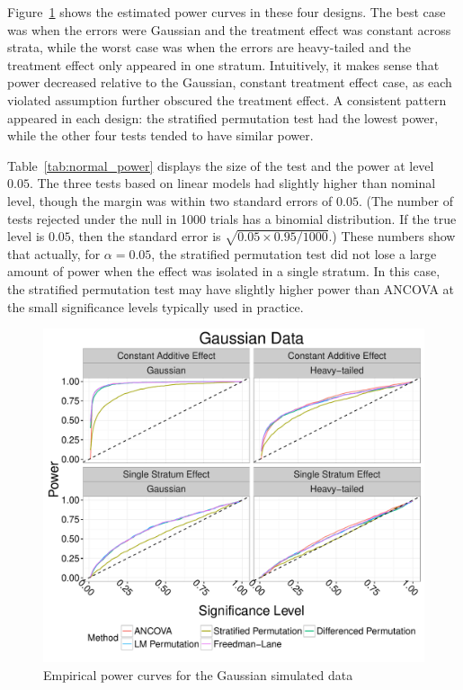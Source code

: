 \documentclass[12pt]{article}
\begin{document}
Figure~\ref{fig:normal_sim_power} shows the estimated power curves in these four designs.
The best case was when the errors were Gaussian and the treatment effect was constant across strata, while the worst case was when the errors are heavy-tailed and the treatment effect only appeared in one stratum.
Intuitively, it makes sense that power decreased relative to the Gaussian, constant treatment effect case, as each violated assumption further obscured the treatment effect.
A consistent pattern appeared in each design: the stratified permutation test had the lowest power, while the other four tests tended to have similar power.

Table~\ref{tab:normal_power} displays the size of the test and the power at level $0.05$.
The three tests based on linear models had slightly higher than nominal level, though the margin was within two standard errors of $0.05$.
(The number of tests rejected under the null in 1000 trials has a binomial distribution.
If the true level is $0.05$, then the standard error is $\sqrt{0.05 \times 0.95/1000}$.)
These numbers show that actually, for $\alpha=0.05$, the stratified permutation test did not lose a large amount of power when the effect was isolated in a single stratum.
In this case, the stratified permutation test may have slightly higher power than ANCOVA at the small significance levels typically used in practice.
\begin{figure}[h]
\centering
\includegraphics[width = \textwidth]{fig/normal_simulation_power.pdf}
\caption{Empirical power curves for the Gaussian simulated data}
\label{fig:normal_sim_power}
\end{figure}
%
\end{document}
